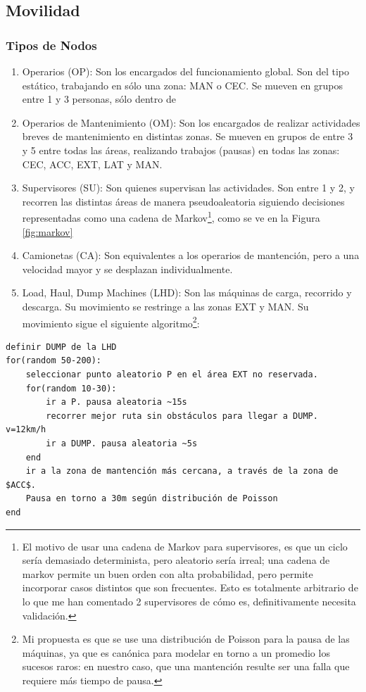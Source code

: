 \documentclass[10pt,preprint,onecolumn]{article}
\begin{document}
\subsection{Movilidad}

\subsubsection{Tipos de Nodos}

\begin{enumerate}
    
    \item Operarios (OP): Son los encargados del funcionamiento global. Son del tipo estático, trabajando en sólo una zona: MAN o CEC. Se mueven en grupos entre 1 y 3 personas, sólo dentro de
    
    \item Operarios de Mantenimiento (OM): Son los encargados de realizar actividades breves de mantenimiento en distintas zonas. Se mueven en grupos de entre 3 y 5 entre todas las áreas, realizando trabajos (pausas) en todas las zonas: CEC, ACC, EXT, LAT y MAN.
    
    \item Supervisores (SU): Son quienes supervisan las actividades. Son entre 1 y 2, y recorren las distintas áreas de manera pseudoaleatoria siguiendo decisiones representadas como una cadena de Markov\footnote{El motivo de usar una cadena de Markov para supervisores, es que un ciclo sería demasiado determinista, pero aleatorio sería irreal; una cadena de markov permite un buen orden con alta probabilidad, pero permite incorporar casos distintos que son frecuentes. Esto es totalmente arbitrario de lo que me han comentado 2 supervisores de cómo es, definitivamente necesita validación.}, como se ve en la Figura \ref{fig:markov}
    
    
    \item Camionetas (CA): Son equivalentes a los operarios de mantención, pero a una velocidad mayor y se desplazan individualmente. 
    
    \item Load, Haul, Dump Machines (LHD): Son las máquinas de carga, recorrido y descarga. Su movimiento se restringe a las zonas EXT y MAN. Su movimiento sigue el siguiente algoritmo\footnote{Mi propuesta es que se use una distribución de Poisson para la pausa de las máquinas, ya que es canónica para modelar en torno a un promedio los sucesos raros: en nuestro caso, que una mantención resulte ser una falla que requiere más tiempo de pausa.}:
    \end{enumerate}
    \begin{verbatim}
definir DUMP de la LHD
for(random 50-200):
    seleccionar punto aleatorio P en el área EXT no reservada.
    for(random 10-30):
        ir a P. pausa aleatoria ~15s
        recorrer mejor ruta sin obstáculos para llegar a DUMP. v=12km/h
        ir a DUMP. pausa aleatoria ~5s
    end
    ir a la zona de mantención más cercana, a través de la zona de $ACC$. 
    Pausa en torno a 30m según distribución de Poisson
end
\end{verbatim}
\end{document}
